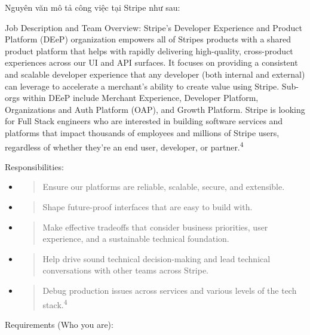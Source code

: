 \documentclass[12pt,a4paper]{article}
\begin{document}
Nguyên văn mô tả công việc tại Stripe như sau:

Job Description and Team Overview: Stripe's Developer Experience and
Product Platform (DEeP) organization empowers all of
Stripe\textquotesingle s products with a shared product platform that
helps with rapidly delivering high-quality, cross-product experiences
across our UI and API surfaces. It focuses on providing a consistent and
scalable developer experience that any developer (both internal and
external) can leverage to accelerate a merchant's ability to create
value using Stripe. Sub-orgs within DEeP include Merchant Experience,
Developer Platform, Organizations and Auth Platform (OAP), and Growth
Platform. Stripe is looking for Full Stack engineers who are interested
in building software services and platforms that impact thousands of
employees and millions of Stripe users, regardless of whether they're an
end user, developer, or partner.\textsuperscript{4}

Responsibilities:

\begin{itemize}
\item
  \begin{quote}
  Ensure our platforms are reliable, scalable, secure, and extensible.
  \end{quote}
\item
  \begin{quote}
  Shape future-proof interfaces that are easy to build with.
  \end{quote}
\item
  \begin{quote}
  Make effective tradeoffs that consider business priorities, user
  experience, and a sustainable technical foundation.
  \end{quote}
\item
  \begin{quote}
  Help drive sound technical decision-making and lead technical
  conversations with other teams across Stripe.
  \end{quote}
\item
  \begin{quote}
  Debug production issues across services and various levels of the tech
  stack.\textsuperscript{4}
  \end{quote}
\end{itemize}

Requirements (Who you are):
\end{document}
